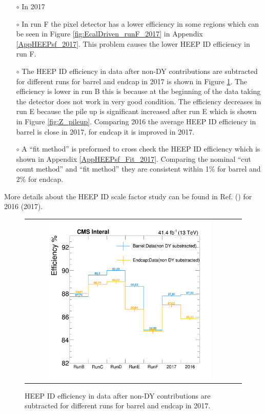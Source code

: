 \medskip
\begin{itemize}
  \item[$\circ$] In 2017
  \item[$\circ$] In run F the pixel detector has a lower efficiency in some regions which can be seen in Figure \ref{fig:EcalDriven_runF_2017} in Appendix \ref{AppHEEPsf_2017}. This problem causes the lower HEEP ID efficiency in run F.
  \item[$\circ$] The HEEP ID efficiency in data after non-DY contributions are subtracted for different runs for barrel and endcap in 2017 is shown in Figure \ref{fig:Runs_HEEP_eff_rereco_2017}. The efficiency is lower in run B this is because at the beginning of the data taking the detector does not work in very good condition. The efficiency decreases in run E because the pile up is significant increased after run E which is shown in Figure \ref{fig:Z_pileup}. Comparing 2016 the average HEEP ID efficiency in barrel is close in 2017, for endcap it is improved in 2017.
  \item[$\circ$] A ``fit method'' is preformed to cross check the HEEP ID efficiency which is shown in Appendix \ref{AppHEEPsf_Fit_2017}. Comparing the nominal ``cut count method'' and ``fit method'' they are consistent within 1\% for barrel and 2\% for endcap.
  \end{itemize}
More details about the HEEP ID scale factor study can be found in Ref. \cite{SF_ref1} (\cite{SF_ref2}) for 2016 (2017).

\begin{figure}[bh]
  \begin{center}
    \begin{tabular}{cc}
      \includegraphics[width=0.8\textwidth]{figures/Zprime/2017/ScaleFactor/SameSign/Runs_HEEP_eff_rereco.png}
    \end{tabular}
    \caption{HEEP ID efficiency in data after non-DY contributions are subtracted for different runs for barrel and endcap in 2017.}
    \label{fig:Runs_HEEP_eff_rereco_2017}
  \end{center}
\end{figure}



